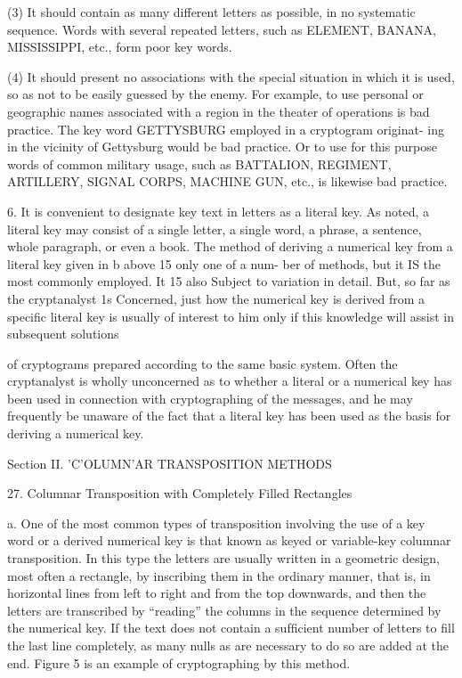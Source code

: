 (3) It should contain as many different letters as possible, in no
systematic sequence. Words with several repeated letters, such
as ELEMENT, BANANA, MISSISSIPPI, etc., form poor
key words.

(4) It should present no associations with the special situation in
which it is used, so as not to be easily guessed by the enemy.
For example, to use personal or geographic names associated
with a region in the theater of operations is bad practice. The
key word GETTYSBURG employed in a cryptogram originat-
ing in the vicinity of Gettysburg would be bad practice. Or to
use for this purpose words of common military usage, such as
BATTALION, REGIMENT, ARTILLERY, SIGNAL
CORPS, MACHINE GUN, etc., is likewise bad practice.

6. It is convenient to designate key text in letters as a literal key. As
noted, a literal key may consist of a single letter, a single word, a phrase,
a sentence, whole paragraph, or even a book. The method of deriving
a numerical key from a literal key given in b above 15 only one of a num-
ber of methods, but it IS the most commonly employed. It 15 also Subject to
variation in detail. But, so far as the cryptanalyst 1s Concerned, just how
the numerical key is derived from a speciﬁc literal key is usually of
interest to him only if this knowledge will assist in subsequent solutions


of cryptograms prepared according to the same basic system. Often the
cryptanalyst is wholly unconcerned as to whether a literal or a numerical
key has been used in connection with cryptographing of the messages,
and he may frequently be unaware of the fact that a literal key has been
used as the basis for deriving a numerical key.

Section II. 'C'OLUMN'AR TRANSPOSITION METHODS

27. Columnar Transposition with Completely Filled Rectangles

a. One of the most common types of transposition involving the use
of a key word or a derived numerical key is that known as keyed or
variable-key columnar transposition. In this type the letters are usually
written in a geometric design, most often a rectangle, by inscribing them
in the ordinary manner, that is, in horizontal lines from left to right and
from the top downwards, and then the letters are transcribed by
“reading” the columns in the sequence determined by the numerical key.
If the text does not contain a sufﬁcient number of letters to ﬁll the last
line completely, as many nulls as are necessary to do so are added at the
end. Figure 5 is an example of cryptographing by this method.


